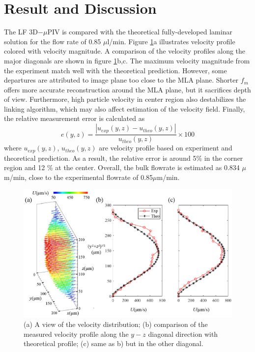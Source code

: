 \documentclass[draftthesis,fullpage]{uiucthesis}
\begin{document}
\section*{Result and Discussion}
The  LF 3D$-\mu$PIV is compared with the theoretical fully-developed laminar solution for the flow rate of 0.85 $\mu$l/min.
Figure \ref{fig:result}a illustrates velocity profile colored with velocity magnitude. A comparison of the velocity profiles along the major diagonals are shown in figure \ref{fig:result}b,c. The maximum velocity magnitude from the experiment match well with the theoretical prediction. However, some departures are attributed to image plane too close to the MLA plane. Shorter $f_m$ offers more accurate reconstruction around the MLA plane, but it sacrifices depth of view. Furthermore, high particle velocity in center region also destabilizes the linking algorithm, which may also affect estimation of the velocity field. Finally, the relative measurement error is calculated as
\begin{equation}
  e(y,z) =  \frac{\left| u_{exp}(y,z) - u_{theo}(y,z) \right|}{u_{theo}(y,z)} \times 100
\label{eq:Uncertainty}
\end{equation}
where $u_{exp}(y,z)$, $u_{theo}(y,z)$ are velocity profile based on experiment and theoretical prediction.
As a result, the relative error is around 5$\%$ in the corner region and 12 $\%$ at the center. Overall, the bulk flowrate is estimated as 0.834 $\mu$m/min, close to the experimental flowrate of 0.85$\mu$m/min.
\begin{figure}[h]
       \centerline{\includegraphics[width = 0.7\linewidth]{fig/figure8.jpg}} 
       \caption{(a) A view of the velocity distribution; (b) comparison of the measured velocity profile along the $y-z$ diagonal direction with theoretical profile; (c) same as b) but in the other diagonal.}
     \label{fig:result}
\end{figure}
\end{document}

